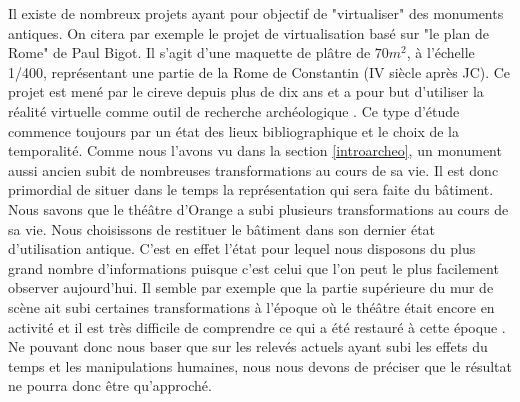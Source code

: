 Il existe de nombreux projets ayant pour objectif de "virtualiser" des monuments antiques. On citera par exemple le projet de virtualisation basé sur "le plan de Rome" de Paul Bigot. Il s'agit d'une maquette de plâtre de $70m^2$, à l'échelle 1/400, représentant une partie de la Rome de Constantin (IV siècle après JC). Ce projet est mené par le \gls{cireve} depuis plus de dix ans et a pour but d'utiliser la réalité virtuelle comme outil de recherche archéologique \cite[p. 157-158]{fleury}. Ce type d'étude commence toujours par un état des lieux bibliographique et le choix de la temporalité. Comme nous l'avons vu dans la section \ref{introarcheo}, un monument aussi ancien subit de nombreuses transformations au cours de sa vie. Il est donc primordial de situer dans le temps la représentation qui sera faite du bâtiment. Nous savons que le théâtre d'Orange a subi plusieurs transformations au cours de sa vie. Nous choisissons de restituer le bâtiment dans son dernier état d'utilisation antique. C'est en effet l'état pour lequel nous disposons du plus grand nombre d'informations puisque c'est celui que l'on peut le plus facilement observer aujourd'hui. Il semble par exemple que la partie supérieure du mur de scène ait subi certaines transformations à l'époque où le théâtre était encore en activité et il est très difficile de comprendre ce qui a été restauré à cette époque \cite[p.33]{orangeTxt}. Ne pouvant donc nous baser que sur les relevés actuels ayant subi les effets du temps et les manipulations humaines, nous nous devons de préciser que le résultat ne pourra donc être qu'approché.


